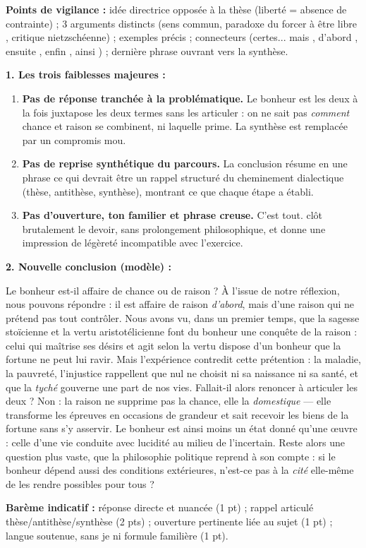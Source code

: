 \documentclass[11pt]{article}
\begin{document}
\begin{corrige}
\medskip
\textbf{Points de vigilance :} idée directrice opposée à la thèse (liberté = absence de contrainte) ; 3 arguments distincts (sens commun, paradoxe du \og forcer à être libre \fg{}, critique nietzschéenne) ; exemples précis ; connecteurs (\og certes... mais \fg{}, \og d'abord \fg{}, \og ensuite \fg{}, \og enfin \fg{}, \og ainsi \fg{}) ; dernière phrase ouvrant vers la synthèse.
\end{corrige}

\begin{corrige}
\textbf{1. Les trois faiblesses majeures :}
\begin{enumerate}
\item \textbf{Pas de réponse tranchée à la problématique.} \og Le bonheur est les deux à la fois \fg{} juxtapose les deux termes sans les articuler : on ne sait pas \emph{comment} chance et raison se combinent, ni laquelle prime. La synthèse est remplacée par un compromis mou.
\item \textbf{Pas de reprise synthétique du parcours.} La conclusion résume en une phrase ce qui devrait être un rappel structuré du cheminement dialectique (thèse, antithèse, synthèse), montrant ce que chaque étape a établi.
\item \textbf{Pas d'ouverture, ton familier et phrase creuse.} \og C'est tout. \fg{} clôt brutalement le devoir, sans prolongement philosophique, et donne une impression de légèreté incompatible avec l'exercice.
\end{enumerate}

\textbf{2. Nouvelle conclusion (modèle) :}

\medskip
Le bonheur est-il affaire de chance ou de raison ? À l'issue de notre réflexion, nous pouvons répondre : il est affaire de raison \emph{d'abord}, mais d'une raison qui ne prétend pas tout contrôler. Nous avons vu, dans un premier temps, que la sagesse stoïcienne et la vertu aristotélicienne font du bonheur une conquête de la raison : celui qui maîtrise ses désirs et agit selon la vertu dispose d'un bonheur que la fortune ne peut lui ravir. Mais l'expérience contredit cette prétention : la maladie, la pauvreté, l'injustice rappellent que nul ne choisit ni sa naissance ni sa santé, et que la \emph{tyché} gouverne une part de nos vies. Fallait-il alors renoncer à articuler les deux ? Non : la raison ne supprime pas la chance, elle la \emph{domestique} — elle transforme les épreuves en occasions de grandeur et sait recevoir les biens de la fortune sans s'y asservir. Le bonheur est ainsi moins un état donné qu'une œuvre : celle d'une vie conduite avec lucidité au milieu de l'incertain. Reste alors une question plus vaste, que la philosophie politique reprend à son compte : si le bonheur dépend aussi des conditions extérieures, n'est-ce pas à la \emph{cité} elle-même de les rendre possibles pour tous ?

\medskip
\textbf{Barème indicatif :} réponse directe et nuancée (1 pt) ; rappel articulé thèse/antithèse/synthèse (2 pts) ; ouverture pertinente liée au sujet (1 pt) ; langue soutenue, sans \og je \fg{} ni formule familière (1 pt).
\end{corrige}
\end{document}
